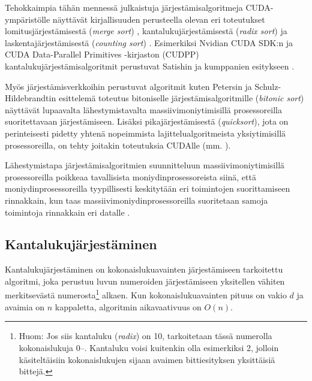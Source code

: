 \documentclass[a4paper,11pt]{article}
\newcommand{\engl}[1]{\foreignlanguage{english}{\em #1}}
\begin{document}
Tehokkaimpia tähän mennessä julkaistuja järjestämisalgoritmeja CUDA-ym\-pä\-ris\-töl\-le näyttävät kirjallisuuden perusteella olevan eri toteutukset lomitusjärjestämisestä (\engl{merge sort}) \cite{satish2009} \cite{satish2010}, kantalukujärjestämisestä (\engl{radix sort}) \cite{satish2009} \cite{merrill2011} ja laskentajärjestämisestä (\engl{counting sort}) \cite{kolonias2011}. Esimerkiksi Nvidian CUDA SDK:n ja CUDA Data-Parallel Primitives -kirjaston (CUDPP) \cite{cudpp} kantalukujärjestämisalgoritmit perustuvat Satishin ja kumppanien esitykseen \cite{satish2009}.

Myös järjestämisverkkoihin perustuvat algoritmit kuten Petersin ja Schulz-Hildebrandtin \cite{peters2012gems} esittelemä toteutus bitoniselle järjestämisalgoritmille (\engl{bitonic sort}) näyttävät lupaavalta lähestymistavalta massiivimoniytimisillä prosessoreilla suoritettavaan järjestämiseen. Lisäksi pikajärjestämisestä (\engl{quicksort}), jota on perinteisesti pidetty yhtenä nopeimmista lajittelualgoritmeista yksiytimisillä prosessoreilla, on tehty joitakin toteutuksia CUDAlle (mm. \cite{cederman2009}).

Lähestymistapa järjestämisalgoritmien suunnitteluun massiivimoniytimisillä prosessoreilla poikkeaa tavallisista moniydinprosessoreista siinä, että moniydinprosessoreilla tyypillisesti keskitytään eri toimintojen suorittamiseen rinnakkain, kun taas massiivimoniydinprosessoreilla suoritetaan samoja toimintoja rinnakkain eri datalle \cite{satish2009}.

\subsection{Kantalukujärjestäminen}

Kantalukujärjestäminen on kokonaislukuavainten järjestämiseen tarkoitettu algoritmi, joka perustuu luvun numeroiden järjestämiseen yksitellen vähiten merkitsevästä numerosta\footnote{Huom: Jos siis kantaluku (\engl{radix}) on 10, tarkoitetaan tässä numerolla kokonaislukuja 0\thinspace--. Kantaluku voisi kuitenkin olla esimerkiksi 2, jolloin käsiteltäisiin kokonaislukujen sijaan avaimen bittiesityksen yksittäisiä bittejä.} alkaen. Kun kokonaislukuavainten pituus on vakio $d$ ja avaimia on $n$ kappaletta, algoritmin aikavaativuus on $O(n)$.
\end{document}
